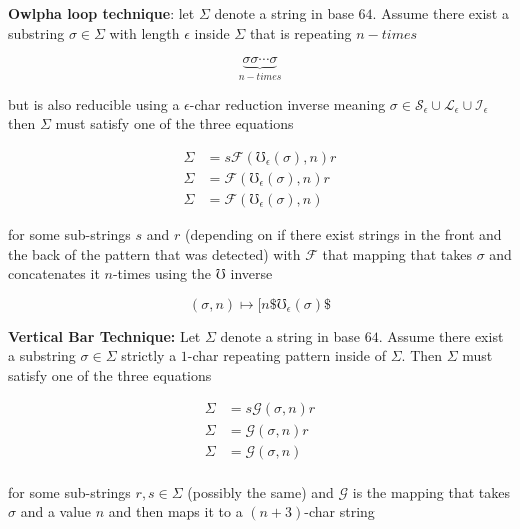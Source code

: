 \documentclass[amsmath,12pt,a4paper]{amsart}
\begin{document}
\textbf{Owlpha loop technique}: let $\Sigma$ denote a string in base $64$. Assume there exist a substring $\sigma \in \Sigma$ with length $\epsilon$ inside $\Sigma$ that is repeating $n-times$


\begin{equation}
\label{Eq49}
\underbrace{\sigma\sigma\cdots\sigma}_{n-times}
\end{equation}

but is also reducible using a $\epsilon$-char reduction inverse meaning $\sigma \in \mathcal{S}_\epsilon \cup \mathcal{L}_{\epsilon}\cup \mathcal{I}_\epsilon$ then $\Sigma$ must satisfy one of the three equations 


\begin{equation}\label{Eq50}
\begin{split}
\Sigma & = s\mathcal{F}(\mho_\epsilon(\sigma),n)r\\
\Sigma & = \mathcal{F}(\mho_\epsilon(\sigma),n)r\\
\Sigma & = \mathcal{F}(\mho_\epsilon(\sigma),n)
\end{split}
\end{equation}

for some sub-strings $s$ and $r$ (depending on if there exist strings in the front and the back of the pattern that was detected) with $\mathcal{F}$ that mapping that takes $\sigma$ and concatenates it $n$-times using the $\mho$ inverse 

\begin{equation}\label{Eq51}
(\sigma,n)\mapsto 
[n\$ \mho_\epsilon(\sigma)\$
\end{equation}

\textbf{Vertical Bar Technique:} Let $\Sigma$ denote a string in base $64$. Assume there exist a substring $\sigma\in \Sigma$ strictly a $1$-char repeating pattern inside of $\Sigma$. Then $\Sigma$ must satisfy one of the three equations 

\begin{equation}\label{Eq52}
\begin{split}
\Sigma & = s\mathcal{G}(\sigma,n)r\\
\Sigma & = \mathcal{G}(\sigma,n)r\\
\Sigma & = \mathcal{G}(\sigma,n)\\
\end{split}
\end{equation}

for some sub-strings $r,s\in \Sigma$ (possibly the same) and $\mathcal{G}$ is the mapping that takes $\sigma$ and  a value $n$ and then maps it to a $(n+3)$-char string 
\end{document}
